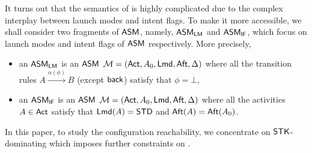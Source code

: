 

It turns out that the semantics of {\AMASS} is highly complicated due to the complex interplay between launch modes and intent flags. %
To make it more accessible, we %
shall consider two fragments of $\textsf{ASM}$, namely, $\textsf{ASM}_\textsf{LM}$ and $\textsf{ASM}_\textsf{IF}$, which focus on launch modes and intent flags of $\textsf{ASM}$ respectively. More precisely, 
\begin{itemize}
	\item an $\textsf{ASM}_\textsf{LM}$ is an $\textsf{ASM}$ ${\mathcal{M} } = ({\sf Act}, A_0, {\sf Lmd}, {\sf Aft}, \Delta)$ where all the transition rules $A \xrightarrow{\alpha(\phi)} B$ (except ${\mathsf{back} }$) satisfy that $\phi = \bot$, 
	\item an $\textsf{ASM}_\textsf{IF}$ is an $\textsf{ASM}$ ${\mathcal{M} } = ({\sf Act}, A_0, {\sf Lmd}, {\sf Aft}, \Delta)$ where all the activities $A\in{\sf Act}$ satisfy that ${\sf Lmd}(A) = \mathsf{STD}$ and ${\sf Aft}(A) = {\sf Aft}(A_0)$.
\end{itemize}



	


%
In this paper, to study the configuration reachability, we %
concentrate on $\mathsf{STK}$-dominating {\AMASS} which imposes further constraints on {\AMASS}. %
	
	
